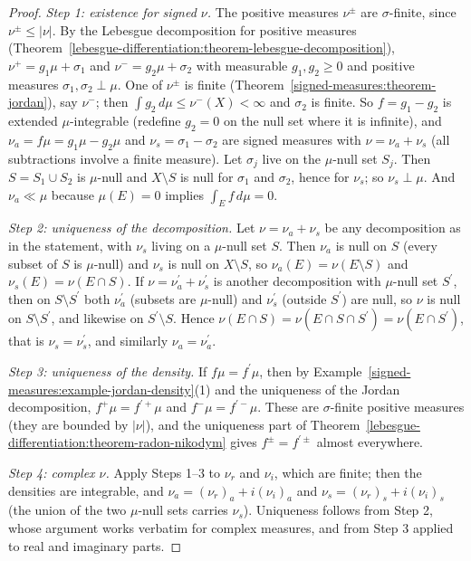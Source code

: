 \begin{proof}
\emph{Step 1: existence for signed $\nu$.} The positive measures $\nu^\pm$ are $\sigma$-finite, since $\nu^\pm \leq |\nu|$. By the Lebesgue decomposition for positive measures
(Theorem~\ref{lebesgue-differentiation:theorem-lebesgue-decomposition}), $\nu^+ = g_1\mu + \sigma_1$ and $\nu^- = g_2\mu + \sigma_2$ with measurable $g_1, g_2 \geq 0$ and positive measures
$\sigma_1, \sigma_2 \perp \mu$. One of $\nu^\pm$ is finite (Theorem~\ref{signed-measures:theorem-jordan}), say $\nu^-$; then $\int g_2\,d\mu \leq \nu^-(X) < \infty$ and $\sigma_2$ is finite. So
$f = g_1 - g_2$ is extended $\mu$-integrable (redefine $g_2 = 0$ on the null set where it is infinite), and $\nu_a = f\mu = g_1\mu - g_2\mu$ and $\nu_s = \sigma_1 - \sigma_2$ are signed measures
with $\nu = \nu_a + \nu_s$ (all subtractions involve a finite measure). Let $\sigma_j$ live on the $\mu$-null set $S_j$. Then $S = S_1 \cup S_2$ is $\mu$-null and $X \setminus S$ is null for
$\sigma_1$ and $\sigma_2$, hence for $\nu_s$; so $\nu_s \perp \mu$. And $\nu_a \ll \mu$ because $\mu(E) = 0$ implies $\int_Ef\,d\mu = 0$.

\emph{Step 2: uniqueness of the decomposition.} Let $\nu = \nu_a + \nu_s$ be any decomposition as in the statement, with $\nu_s$ living on a $\mu$-null set $S$. Then $\nu_a$ is null on $S$ (every subset
of $S$ is $\mu$-null) and $\nu_s$ is null on $X \setminus S$, so $\nu_a(E) = \nu(E \setminus S)$ and $\nu_s(E) = \nu(E \cap S)$. If $\nu = \nu_a^{\prime} + \nu_s^{\prime}$ is another decomposition with
$\mu$-null set $S^{\prime}$, then on $S \setminus S^{\prime}$ both $\nu_a^{\prime}$ (subsets are $\mu$-null) and $\nu_s^{\prime}$ (outside $S^{\prime}$) are null, so $\nu$ is null on $S \setminus S^{\prime}$, and
likewise on $S^{\prime} \setminus S$. Hence $\nu(E \cap S) = \nu(E \cap S \cap S^{\prime}) = \nu(E \cap S^{\prime})$, that is $\nu_s = \nu_s^{\prime}$, and similarly $\nu_a = \nu_a^{\prime}$.

\emph{Step 3: uniqueness of the density.} If $f\mu = f^{\prime}\mu$, then by Example~\ref{signed-measures:example-jordan-density}(1) and the uniqueness of the Jordan decomposition,
$f^+\mu = f^{\prime +}\mu$ and $f^-\mu = f^{\prime -}\mu$. These are $\sigma$-finite positive measures (they are bounded by $|\nu|$), and the uniqueness part of
Theorem~\ref{lebesgue-differentiation:theorem-radon-nikodym} gives $f^\pm = f^{\prime\pm}$ almost everywhere.

\emph{Step 4: complex $\nu$.} Apply Steps 1--3 to $\nu_r$ and $\nu_i$, which are finite; then the densities are integrable, and $\nu_a = (\nu_r)_a + i(\nu_i)_a$ and $\nu_s = (\nu_r)_s + i(\nu_i)_s$ (the
union of the two $\mu$-null sets carries $\nu_s$). Uniqueness follows from Step 2, whose argument works verbatim for complex measures, and from Step 3 applied to real and imaginary parts.
\end{proof}

